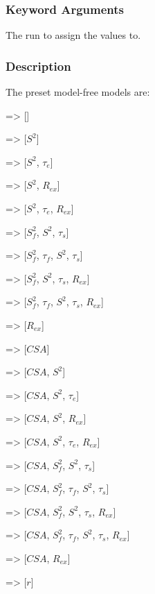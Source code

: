 \subsubsection{Keyword Arguments}

  The run to assign the values to.


\subsubsection{Description}

The preset model-free models are:
    
    => []
    
    => [$S^2$]
    
    => [$S^2$, $\tau_e$]
    
    => [$S^2$, $R_{ex}$]
    
    => [$S^2$, $\tau_e$, $R_{ex}$]
    
    => [$S^2_f$, $S^2$, $\tau_s$]
    
    => [$S^2_f$, $\tau_f$, $S^2$, $\tau_s$]
    
    => [$S^2_f$, $S^2$, $\tau_s$, $R_{ex}$]
    
    => [$S^2_f$, $\tau_f$, $S^2$, $\tau_s$, $R_{ex}$]
    
    => [$R_{ex}$]

    
   => [$CSA$]
    
   => [$CSA$, $S^2$]
    
   => [$CSA$, $S^2$, $\tau_e$]
    
   => [$CSA$, $S^2$, $R_{ex}$]
    
   => [$CSA$, $S^2$, $\tau_e$, $R_{ex}$]
    
   => [$CSA$, $S^2_f$, $S^2$, $\tau_s$]
    
   => [$CSA$, $S^2_f$, $\tau_f$, $S^2$, $\tau_s$]
    
   => [$CSA$, $S^2_f$, $S^2$, $\tau_s$, $R_{ex}$]
    
   => [$CSA$, $S^2_f$, $\tau_f$, $S^2$, $\tau_s$, $R_{ex}$]
    
   => [$CSA$, $R_{ex}$]

    
   => [$r$]
    
